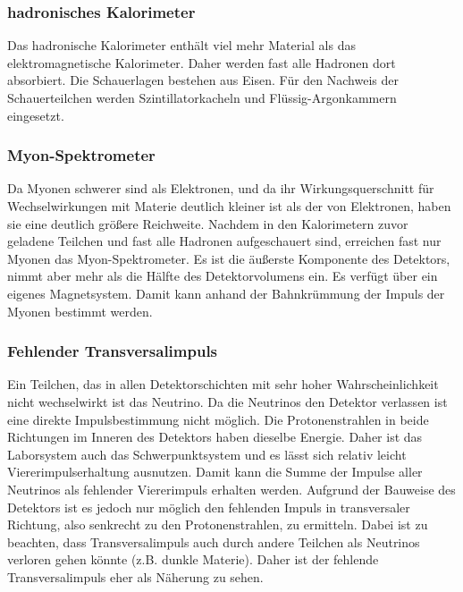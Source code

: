 \subsubsection{hadronisches Kalorimeter}
Das hadronische Kalorimeter enthält viel mehr Material als das elektromagnetische Kalorimeter.
Daher werden fast alle Hadronen dort absorbiert.
Die Schauerlagen bestehen aus Eisen.
Für den Nachweis der Schauerteilchen werden Szintillatorkacheln und Flüssig-Argonkammern eingesetzt.

\subsubsection{Myon-Spektrometer}
Da Myonen schwerer sind als Elektronen, und da ihr Wirkungsquerschnitt für Wechselwirkungen mit Materie deutlich kleiner ist als der von Elektronen, haben sie eine deutlich größere Reichweite.
Nachdem in den Kalorimetern zuvor geladene Teilchen und fast alle Hadronen aufgeschauert sind, erreichen fast nur Myonen das Myon-Spektrometer.
Es ist die äußerste Komponente des Detektors, nimmt aber mehr als die Hälfte des Detektorvolumens ein.
Es verfügt über ein eigenes Magnetsystem.
Damit kann anhand der Bahnkrümmung der Impuls der Myonen bestimmt werden.

\subsubsection{Fehlender Transversalimpuls}
Ein Teilchen, das in allen Detektorschichten mit sehr hoher Wahrscheinlichkeit nicht wechselwirkt ist das Neutrino.
Da die Neutrinos den Detektor verlassen ist eine direkte Impulsbestimmung nicht möglich.
Die Protonenstrahlen in beide Richtungen im Inneren des Detektors haben dieselbe Energie.
Daher ist das Laborsystem auch das Schwerpunktsystem und es lässt sich relativ leicht Viererimpulserhaltung ausnutzen.
Damit kann die Summe der Impulse aller Neutrinos als fehlender Viererimpuls erhalten werden.
Aufgrund der Bauweise des Detektors ist es jedoch nur möglich den fehlenden Impuls in transversaler Richtung, also senkrecht zu den Protonenstrahlen, zu ermitteln.
Dabei ist zu beachten, dass Transversalimpuls auch durch andere Teilchen als Neutrinos verloren gehen könnte (z.B. dunkle Materie).
Daher ist der fehlende Transversalimpuls eher als Näherung zu sehen.

